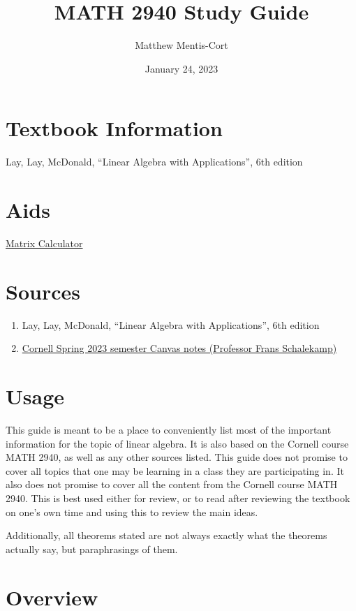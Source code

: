 \documentclass[a4paper,12pt]{article}
\title{MATH 2940 Study Guide}
\author{Matthew Mentis-Cort}
\date{January 24, 2023}
\theoremstyle{definition}
\theoremstyle{definition}
\begin{document}
	\maketitle
	
	\tableofcontents
	\newpage
	
	\section{Textbook Information}
	Lay, Lay, McDonald, “Linear Algebra with Applications”, 6th edition
	\section{Aids}
	\href{https://matrixcalc.org/}{Matrix Calculator}
	
	\section{Sources}
	\begin{enumerate}
		\item Lay, Lay, McDonald, “Linear Algebra with Applications”, 6th edition
		
		\item \href{https://canvas.cornell.edu/courses/48198}{Cornell Spring 2023 semester Canvas notes (Professor Frans Schalekamp)}
	\end{enumerate}
	
	\section{Usage}
	This guide is meant to be a place to conveniently list most of the important information for the topic of linear algebra. It is also based on the Cornell course MATH 2940, as well as any other sources listed. This guide does not promise to cover all topics that one may be learning in a class they are participating in. It also does not promise to cover all the content from the Cornell course MATH 2940. This is best used either for review, or to read after reviewing the textbook on one's own time and using this to review the main ideas.
	
	Additionally, all theorems stated are not always exactly what the theorems actually say, but paraphrasings of them.
	\newpage
	
	\section{Overview}
\end{document}
